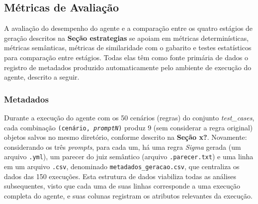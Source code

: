 \subsection{Métricas de Avaliação}

A avaliação do desempenho do agente e a comparação entre os quatro estágios de geração descritos na \textbf{Seção estrategias} se apoiam em métricas determinísticas, métricas semânticas, métricas de similaridade com o gabarito e testes estatísticos para comparação entre estágios.
Todas elas têm como fonte primária de dados o registro de metadados produzido automaticamente pelo ambiente de execução do agente, descrito a seguir.

\subsubsection{Metadados}

Durante a execução do agente com os 50 cenários (regras) do conjunto \textit{test\_cases}, cada combinação \texttt{(cenário, \textit{promptN})} produz $9$ (sem considerar a regra original) objetos salvos no mesmo diretório, conforme descrito na \textbf{Seção x?}.
Novamente: considerando os três \textit{prompts}, para cada um, há uma regra \textit{Sigma} gerada (um arquivo \texttt{.yml}), um parecer do juiz semântico (arquivo \texttt{.parecer.txt}) e uma linha em um arquivo \texttt{.csv}, denominado \texttt{metadados\_geracao.csv}, que centraliza os dados das 150 execuções. 
Esta estrutura de dados viabiliza todas as análises subsequentes, visto que cada uma de suas linhas corresponde a uma execução completa do agente, e suas colunas registram os atributos relevantes da execução.

